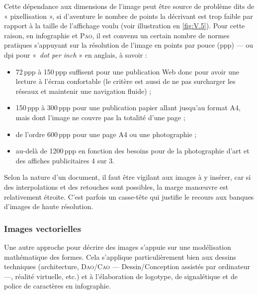 Cette dépendance aux dimensions de l'image peut être source de problème dits de « pixellisation », si d'aventure le nombre de points la décrivant est trop faible par rapport à la taille de l'affichage voulu (voir illustration en \cref{fig:V.5}). Pour cette raison, en infographie et \textsc{Pao}, il est convenu un certain nombre de normes pratiques s'appuyant sur la résolution de l'image en points par pouce (ppp) --- ou dpi pour «~\textit{dot per inch} » en anglais, à savoir :
\begin{itemize}
	\item 72\,ppp à 150\,ppp suffisent pour une publication Web donc pour avoir une lecture à l'écran confortable (le critère est aussi de ne pas surcharger les réseaux et maintenir une navigation fluide) ;
	\item 150\,ppp à 300\,ppp pour une publication papier allant jusqu'au format A4, mais dont l'image ne couvre pas la totalité d'une page ;
	\item de l'ordre 600\,ppp pour une page A4 ou une photographie ;
	\item au-delà de 1200\,ppp en fonction des besoins pour de la photographie d'art et des affiches publicitaires 4 sur 3.
\end{itemize}

Selon la nature d'un document, il faut être vigilant aux images à y insérer, car si des interpolations et des retouches sont possibles, la marge manœuvre est relativement étroite. C'est parfois un casse-tête qui justifie le recours aux banques d'images de haute résolution.


\subsubsection[Images vectorielles]{Images vectorielles}
\label{subsub:V.2.1.2}

Une autre approche pour décrire des images s'appuie sur une modélisation mathématique des formes. Cela s'applique particulièrement bien aux dessins techniques (architecture, \textsc{Dao}/\textsc{Cao} --- Dessin/Conception assistés par ordinateur ---, réalité virtuelle, etc.) et à l'élaboration de logotype, de signalétique et de police de caractères en infographie.

